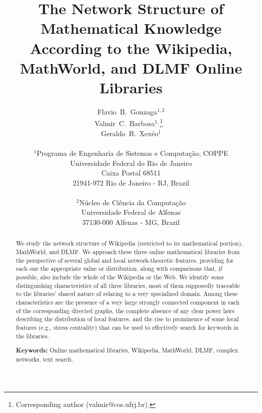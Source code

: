 \documentclass{article}
\begin{document}
\title{The Network Structure of Mathematical Knowledge According to the
Wikipedia, MathWorld, and DLMF Online Libraries}

\author{Flavio~B.~Gonzaga$^{1,2}$\\
Valmir~C.~Barbosa$^{1,}$\thanks{Corresponding author
(valmir@cos.ufrj.br).}$\mbox{\ }$\\
Geraldo~B.~Xex\'eo$^1$\\
\\
$^1$Programa de Engenharia de Sistemas e Computa\c c\~ao, COPPE\\
Universidade Federal do Rio de Janeiro\\
Caixa Postal 68511\\
21941-972 Rio de Janeiro - RJ, Brazil\\
\\
$^2$N\'ucleo de Ci\^encia da Computa\c c\~ao\\
Universidade Federal de Alfenas\\
37130-000 Alfenas - MG, Brazil}

\date{}

\maketitle

\begin{abstract}
We study the network structure of Wikipedia (restricted to its mathematical
portion), MathWorld, and DLMF. We approach these three online mathematical
libraries from the perspective of several global and local network-theoretic
features, providing for each one the appropriate value or distribution, along
with comparisons that, if possible, also include the whole of the Wikipedia or
the Web. We identify some distinguishing characteristics of all three libraries,
most of them supposedly traceable to the libraries' shared nature of relating to
a very specialized domain. Among these characteristics are the presence of a
very large strongly connected component in each of the corresponding directed
graphs, the complete absence of any clear power laws describing the distribution
of local features, and the rise to prominence of some local features (e.g.,
stress centrality) that can be used to effectively search for keywords in the
libraries.

\bigskip
\noindent
\textbf{Keywords:} Online mathematical libraries, Wikipedia, MathWorld, DLMF,
complex networks, text search.
\end{abstract}
\end{document}
